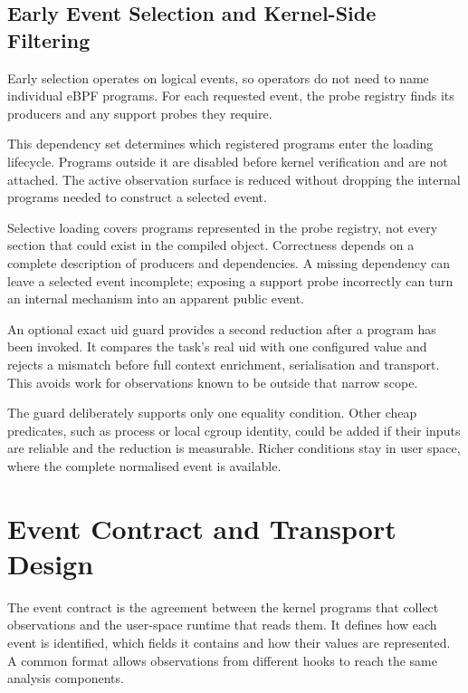 \subsection{Early Event Selection and Kernel-Side Filtering}
\label{subsec:early-event-selection-filtering}

Early selection operates on logical events, so operators do not need to name
individual eBPF programs. For each requested event, the probe registry finds
its producers and any support probes they require.

This dependency set determines which registered programs enter the loading
lifecycle. Programs outside it are disabled before kernel verification and are
not attached. The active observation surface is reduced without dropping the
internal programs needed to construct a selected event.

Selective loading covers programs represented in the probe registry, not every
section that could exist in the compiled object. Correctness depends on a
complete description of producers and dependencies. A missing dependency can
leave a selected event incomplete; exposing a support probe incorrectly can
turn an internal mechanism into an apparent public event.

An optional exact \gls{uid} guard provides a second reduction after a program
has been invoked. It compares the task's real \gls{uid} with one configured
value and rejects a mismatch before full context enrichment, serialisation and
transport. This avoids work for observations known to be outside that narrow
scope.

The guard deliberately supports only one equality condition. Other cheap
predicates, such as process or local cgroup identity, could be added if their
inputs are reliable and the reduction is measurable. Richer conditions stay in
user space, where the complete normalised event is available.

\section{Event Contract and Transport Design}
  \label{sec:event-contract-transport-design}

  The event contract is the agreement between the kernel programs that collect
  observations and the user-space runtime that reads them. It defines how each
  event is identified, which fields it contains and how their values are
  represented. A common format allows observations from different hooks to
  reach the same analysis components.

